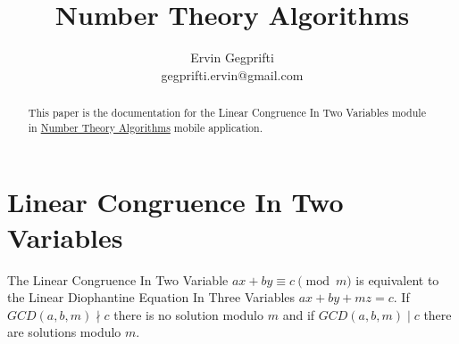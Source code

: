 \documentclass[12pt,oneside,a4paper]{article}
\title{Number Theory Algorithms}
\author{Ervin Gegprifti \\ [6pt]
	gegprifti.ervin@gmail.com}
\date{}
\begin{document}
\pagecolor{bgcolor}

\maketitle

\begin{abstract}
	This paper is the documentation for the Linear Congruence In Two Variables module in \href{https://play.google.com/store/apps/details?id=com.gegprifti.android.numbertheoryalgorithms}{Number Theory Algorithms} mobile application.
\end{abstract}

\section*{Linear Congruence In Two Variables}	
The Linear Congruence In Two Variable $ax+by \equiv c \pmod{m}$ is equivalent to the Linear Diophantine Equation In Three Variables $ax+by+mz=c$. If $GCD(a,b,m) \nmid c$ there is no solution modulo $m$ and if $GCD(a,b,m) \mid c$ there are solutions modulo $m$. \\
\end{document}
